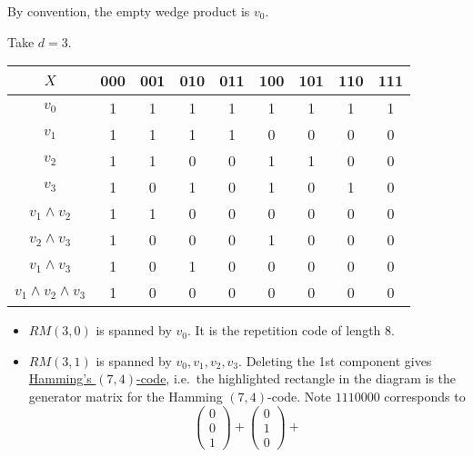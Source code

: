 \documentclass{article}
\newcommand{\F}{\mathbb{F}}
\newcommand{\1}[1]{\mathbbm{1}_{#1}}
\begin{document}
By convention, the empty wedge product is $v_0$.
\begin{eg}
    Take $d = 3$.
    \begin{center}
    \begin{tabular}{c | c c c c c c c c}
        $X$ & 000 & 001 & 010 & 011 & 100 & 101 & 110 & 111 \\
        \hline
        $v_0$ & 1 & 1 & 1 & 1 & 1 & 1 & 1 & 1 \\
        $v_1$ & 1 & 1 & 1 & 1 & 0 & 0 & 0 & 0 \\
        $v_2$ & 1 & 1 & 0 & 0 & 1 & 1 & 0 & 0 \\
        $v_3$ & 1 & 0 & 1 & 0 & 1 & 0 & 1 & 0 \\
        \hline
        $v_1 \wedge v_2$ & 1 & 1 & 0 & 0 & 0 & 0 & 0 & 0 \\
        $v_2 \wedge v_3$ & 1 & 0 & 0 & 0 & 1 & 0 & 0 & 0 \\
        $v_1 \wedge v_3$ & 1 & 0 & 1 & 0 & 0 & 0 & 0 & 0 \\
        $v_1 \wedge v_2 \wedge v_3$ & 1 & 0 & 0 & 0 & 0 & 0 & 0 & 0
    \end{tabular}
    \end{center}
    \begin{itemize}
        \item $RM(3, 0)$ is spanned by $v_0$. It is the repetition code of length $8$.
        \item $RM(3, 1)$ is spanned by $v_0, v_1, v_2, v_3$.
            Deleting the 1st component gives \hyperlink{def:hammingCode}{Hamming's $(7, 4)$-code}, i.e.\ the highlighted rectangle in the diagram is the generator matrix for the Hamming $(7, 4)$-code.
            Note $1110000$ corresponds to
            \begin{equation*}
            \begin{pmatrix}0 \\ 0 \\ 1\end{pmatrix} +
            \begin{pmatrix}0 \\ 1 \\ 0\end{pmatrix} +

\end{equation*}
\end{itemize}
\end{eg}
\end{document}
